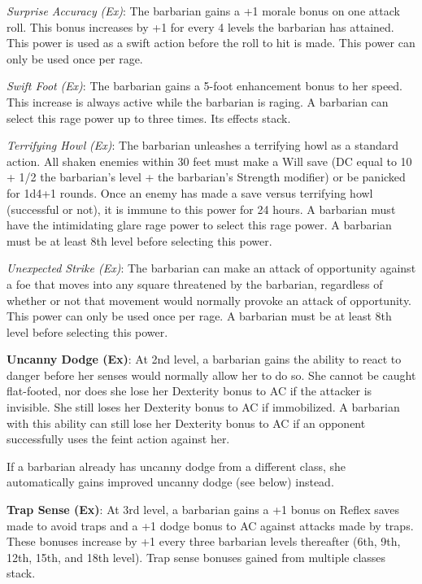 \textit{Surprise Accuracy} \textit{(Ex)}: The barbarian gains a +1 morale bonus on one attack roll. This bonus increases by +1 for every 4 levels the barbarian has attained. This power is used as a swift action before the roll to hit is made. This power can only be used once per rage.
				
\textit{Swift Foot} \textit{(Ex)}: The barbarian gains a 5-foot enhancement bonus to her speed. This increase is always active while the barbarian is raging. A barbarian can select this rage power up to three times. Its effects stack. 
				
\textit{Terrifying Howl} \textit{(Ex)}: The barbarian unleashes a terrifying howl as a standard action. All shaken enemies within 30 feet must make a Will save (DC equal to 10 + 1/2 the barbarian's level + the barbarian's Strength modifier) or be panicked for 1d4+1 rounds. Once an enemy has made a save versus terrifying howl (successful or not), it is immune to this power for 24 hours. A barbarian must have the intimidating glare rage power to select this rage power. A barbarian must be at least 8th level before selecting this power.
				
\textit{Unexpected Strike (Ex)}: The barbarian can make an attack of opportunity against a foe that moves into any square threatened by the barbarian, regardless of whether or not that movement would normally provoke an attack of opportunity. This power can only be used once per rage. A barbarian must be at least 8th level before selecting this power.
				
\textbf{Uncanny Dodge (Ex)}: At 2nd level, a barbarian gains the ability to react to danger before her senses would normally allow her to do so. She cannot be caught flat-footed, nor does she lose her Dexterity bonus to AC if the attacker is invisible. She still loses her Dexterity bonus to AC if immobilized. A barbarian with this ability can still lose her Dexterity bonus to AC if an opponent successfully uses the feint action against her.
				
If a barbarian already has uncanny dodge from a different class, she automatically gains improved uncanny dodge (see below) instead.
				
\textbf{Trap Sense (Ex)}: At 3rd level, a barbarian gains a +1 bonus on Reflex saves made to avoid traps and a +1 dodge bonus to AC against attacks made by traps. These bonuses increase by +1 every three barbarian levels thereafter (6th, 9th, 12th, 15th, and 18th level). Trap sense bonuses gained from multiple classes stack.
				
